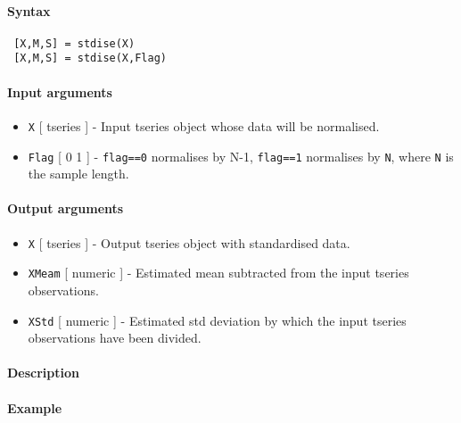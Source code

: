 


	\paragraph{Syntax}
 
 \begin{verbatim}
 [X,M,S] = stdise(X)
 [X,M,S] = stdise(X,Flag)
 \end{verbatim}
 
 \paragraph{Input arguments}
 
 \begin{itemize}
 \item
   \texttt{X} {[} tseries {]} - Input tseries object whose data will be
   normalised.
 \item
   \texttt{Flag} {[} 0 \textbar{} 1 {]} - \texttt{flag==0} normalises by
   N-1, \texttt{flag==1} normalises by \texttt{N}, where \texttt{N} is
   the sample length.
 \end{itemize}
 
 \paragraph{Output arguments}
 
 \begin{itemize}
 \item
   \texttt{X} {[} tseries {]} - Output tseries object with standardised
   data.
 \item
   \texttt{XMeam} {[} numeric {]} - Estimated mean subtracted from the
   input tseries observations.
 \item
   \texttt{XStd} {[} numeric {]} - Estimated std deviation by which the
   input tseries observations have been divided.
 \end{itemize}
 
 \paragraph{Description}
 
 \paragraph{Example}


